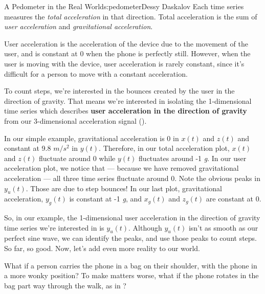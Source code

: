 \begin{aosachapter}{A Pedometer in the Real World}{s:pedometer}{Dessy Daskalov}
Each time series measures the \emph{total acceleration} in that
direction. Total acceleration is the sum of \emph{user acceleration} and
\emph{gravitational acceleration}.

User acceleration is the acceleration of the device due to the movement
of the user, and is constant at 0 when the phone is perfectly still.
However, when the user is moving with the device, user acceleration is
rarely constant, since it's difficult for a person to move with a
constant acceleration.


To count steps, we're interested in the bounces created by the user in
the direction of gravity. That means we're interested in isolating the
1-dimensional time series which describes \textbf{user acceleration in
the direction of gravity} from our 3-dimensional acceleration signal
().

In our simple example, gravitational acceleration is 0 in $x(t)$ and
$z(t)$ and constant at 9.8 $m/s^2$ in $y(t)$. Therefore, in our total
acceleration plot, $x(t)$ and $z(t)$ fluctuate around 0 while $y(t)$
fluctuates around -1 \emph{g}. In our user acceleration plot, we notice
that --- because we have removed gravitational acceleration --- all
three time series fluctuate around 0. Note the obvious peaks in
$y_{u}(t)$. Those are due to step bounces! In our last plot,
gravitational acceleration, $y_{g}(t)$ is constant at -1 \emph{g}, and
$x_{g}(t)$ and $z_{g}(t)$ are constant at 0.

So, in our example, the 1-dimensional user acceleration in the direction
of gravity time series we're interested in is $y_{u}(t)$. Although
$y_{u}(t)$ isn't as smooth as our perfect sine wave, we can identify the
peaks, and use those peaks to count steps. So far, so good. Now, let's
add even more reality to our world.

\label{people-are-complicated-creatures}

What if a person carries the phone in a bag on their shoulder, with the
phone in a more wonky position? To make matters worse, what if the phone
rotates in the bag part way through the walk, as in
?



\end{aosachapter}
